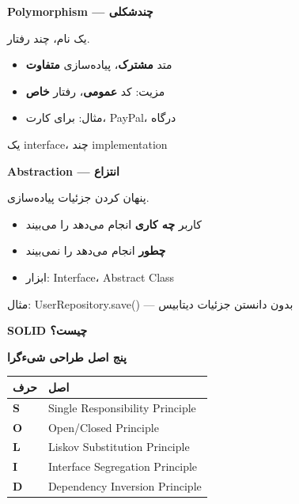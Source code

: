 \documentclass[14pt, a4paper, landscape]{extarticle}
\newcommand{\slide}[1]{%
    \newpage
    \begin{center}
    \begin{minipage}[t]{0.95\textwidth}
    \vspace{0.5cm}
    #1
    \vspace{0.5cm}
    \end{minipage}
    \end{center}
}
\newcommand{\slidetitle}[1]{%
    \begin{center}
        {\LARGE\bfseries\textcolor{primary}{#1}}
    \end{center}
    \vspace{0.5cm}
}
\newcommand{\myaccent}[1]{\textcolor{accent}{#1}}
\begin{document}
\slide{
    \slidetitle{Polymorphism — چندشکلی}
    \vspace{0.5cm}
    {\large یک نام، چند رفتار.}
    \vspace{0.8cm}
    \begin{itemize}[itemsep=0.5em]
        \item متد \textbf{مشترک}، پیاده‌سازی \textbf{متفاوت}
        \item مزیت: کد \textbf{عمومی}، رفتار \textbf{خاص}
        \item مثال: \lr{pay()} برای کارت، PayPal، درگاه
    \end{itemize}
    \vspace{0.8cm}
    \begin{center}
        {\myaccent{یک interface، چند implementation}}
    \end{center}
}

\slide{
    \slidetitle{Abstraction — انتزاع}
    \vspace{0.5cm}
    {\large پنهان کردن جزئیات پیاده‌سازی.}
    \vspace{0.8cm}
    \begin{itemize}[itemsep=0.5em]
        \item کاربر \textbf{چه کاری} انجام می‌دهد را می‌بیند
        \item \textbf{چطور} انجام می‌دهد را نمی‌بیند
        \item ابزار: Interface، Abstract Class
    \end{itemize}
    \vspace{0.8cm}
    \begin{center}
        {\myaccent{مثال: UserRepository.save() — بدون دانستن جزئیات 
دیتابیس}}
    \end{center}
}

\slide{
    \slidetitle{SOLID چیست؟}
    \vspace{0.5cm}
    \begin{center}
        {\large\bfseries پنج اصل طراحی شیءگرا}
    \end{center}
    \vspace{0.8cm}
    \begin{center}
        \begin{tabular}{lp{9cm}}
            \toprule
            \textbf{حرف} & \textbf{اصل} \\
            \midrule
            \textbf{S} & Single Responsibility Principle \\
            \hline
            \textbf{O} & Open/Closed Principle \\
            \hline
            \textbf{L} & Liskov Substitution Principle \\
            \hline
            \textbf{I} & Interface Segregation Principle \\
            \hline
            \textbf{D} & Dependency Inversion Principle \\
            \bottomrule
        \end{tabular}
    \end{center}
}
\end{document}
